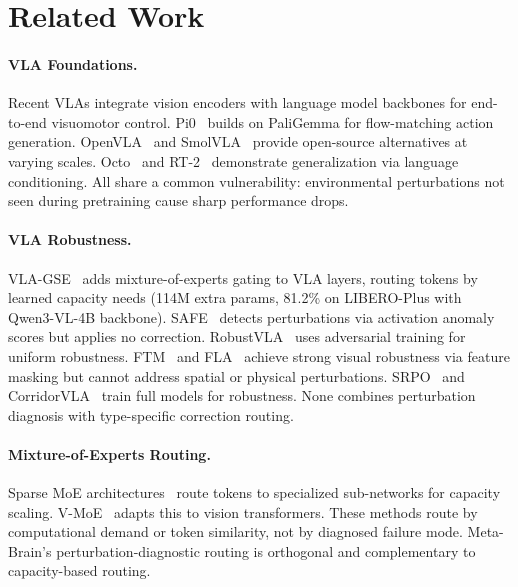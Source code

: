 \documentclass[10pt,twocolumn]{article}
\newcommand{\ours}{Meta-Brain}
\newcommand{\liplus}{LIBERO-Plus}
\begin{document}
\section{Related Work}
\label{sec:related}

\paragraph{VLA Foundations.}
Recent VLAs integrate vision encoders with language model backbones for end-to-end visuomotor control.
Pi0~\cite{black2024pi0} builds on PaliGemma for flow-matching action generation.
OpenVLA~\cite{kim2024openvla} and SmolVLA~\cite{smolvla2025} provide open-source alternatives at varying scales.
Octo~\cite{octo2024} and RT-2~\cite{brohan2023rt2} demonstrate generalization via language conditioning.
All share a common vulnerability: environmental perturbations not seen during pretraining cause sharp performance drops.

\paragraph{VLA Robustness.}
VLA-GSE~\cite{vlagserouting2026} adds mixture-of-experts gating to VLA layers, routing tokens by learned capacity needs (114M extra params, 81.2\% on \liplus{} with Qwen3-VL-4B backbone).
SAFE~\cite{safe2026} detects perturbations via activation anomaly scores but applies no correction.
RobustVLA~\cite{luo2025robustvla} uses adversarial training for uniform robustness.
FTM~\cite{yang2025ftm} and FLA~\cite{yang2025fla} achieve strong visual robustness via feature masking but cannot address spatial or physical perturbations.
SRPO~\cite{chen2025srpo} and CorridorVLA~\cite{corridorvla2026} train full models for robustness.
None combines perturbation diagnosis with type-specific correction routing.

\paragraph{Mixture-of-Experts Routing.}
Sparse MoE architectures~\cite{fedus2022switch,lepikhin2020gshard,zoph2022stmoe} route tokens to specialized sub-networks for capacity scaling.
V-MoE~\cite{riquelme2021vmoe} adapts this to vision transformers.
These methods route by computational demand or token similarity, not by diagnosed failure mode.
\ours{}'s perturbation-diagnostic routing is orthogonal and complementary to capacity-based routing.
\end{document}
